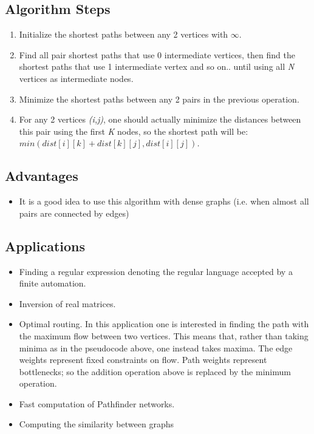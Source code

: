 \documentclass[]{article}
\begin{document}
	\subsection{Algorithm Steps}
	\begin{enumerate}
		\item Initialize the shortest paths between any 2 vertices with $\infty$.
		\item Find all pair shortest paths that use 0 intermediate vertices, then find the shortest paths that use 1 intermediate vertex and so on.. until using all \textit{N} vertices as intermediate nodes.
		\item Minimize the shortest paths between any 2 pairs in the previous operation.
		\item For any 2 vertices \textit{(i,j)}, one should actually minimize the distances between this pair using the first \textit{K} nodes, so the shortest path will be: \textit{$min(dist[i][k]+dist[k][j],dist[i][j])$.}
	\end{enumerate}

	\subsection{Advantages}
	\begin{itemize}
		\item It is a good idea to use this algorithm with dense graphs (i.e. when almost all pairs are connected by edges)
	\end{itemize}
	
	\subsection{Applications}
	\begin{itemize}
		\item  Finding a regular expression denoting the regular language accepted by a finite automation.
		\item Inversion of real matrices.
		\item Optimal routing. In this application one is interested in finding the path with the maximum flow between two vertices. This means that, rather than taking minima as in the pseudocode above, one instead takes maxima. The edge weights represent fixed constraints on flow. Path weights represent bottlenecks; so the addition operation above is replaced by the minimum operation.
		\item Fast computation of Pathfinder networks.
		\item Computing the similarity between graphs
	\end{itemize}
\end{document}

